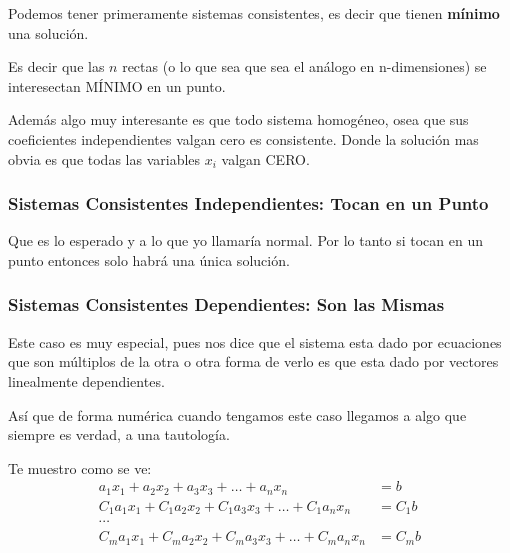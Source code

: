 \documentclass[12pt, fleqn]{report}                             %
\theoremstyle{break}                                            %
\begin{document}
                Podemos tener primeramente sistemas consistentes, es decir que tienen \textbf{mínimo}
                una solución.

                Es decir que las $n$ rectas (o lo que sea que sea el análogo en n-dimensiones)
                se interesectan MÍNIMO en un punto.

                Además algo muy interesante es que todo sistema homogéneo, osea que sus coeficientes
                independientes valgan cero es consistente. Donde la solución mas obvia es que
                todas las variables $x_i$ valgan CERO.

                \clearpage
                \subsubsection{Sistemas Consistentes Independientes: Tocan en un Punto}

                    Que es lo esperado y a lo que yo llamaría normal.
                    Por lo tanto si tocan en un punto entonces solo habrá una única solución.


                \vspace{1em}
                \subsubsection{Sistemas Consistentes Dependientes: Son las Mismas}

                    Este caso es muy especial, pues nos dice que el sistema esta
                    dado por ecuaciones que son múltiplos de la otra o otra forma
                    de verlo es que esta dado por vectores linealmente dependientes.

                    Así que de forma numérica cuando tengamos este caso llegamos a
                    algo que siempre es verdad, a una tautología.

                    Te muestro como se ve:
                    \begin{align*}
                        a_1x_1    + a_2x_2    + a_3x_3    + \dots + a_nx_n    &= b    \\
                        C_1a_1x_1 + C_1a_2x_2 + C_1a_3x_3 + \dots + C_1a_nx_n &= C_1b \\
                        \cdots                                                        \\
                        C_ma_1x_1 + C_ma_2x_2 + C_ma_3x_3 + \dots + C_ma_nx_n &= C_mb \\
                    \end{align*}
\end{document}
